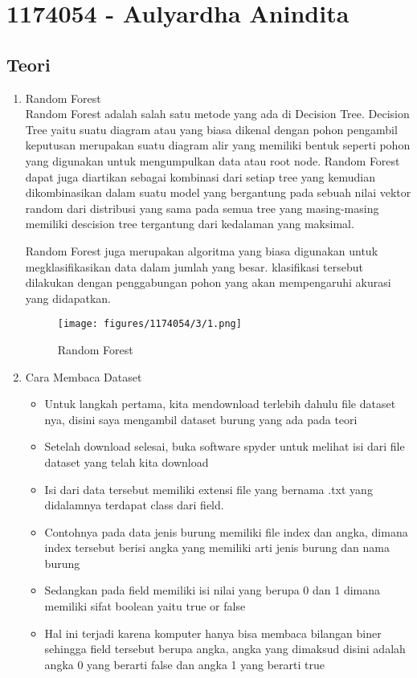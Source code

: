 \section{1174054 - Aulyardha Anindita}

\subsection{Teori}
\begin{enumerate}
\item Random Forest \\
Random Forest adalah salah satu metode yang ada di Decision Tree. Decision Tree yaitu suatu diagram atau yang biasa dikenal dengan pohon pengambil keputusan merupakan suatu diagram alir yang memiliki bentuk seperti pohon yang digunakan untuk mengumpulkan data atau root node. Random Forest dapat juga diartikan sebagai kombinasi dari setiap tree yang kemudian dikombinasikan dalam suatu model yang bergantung pada sebuah nilai vektor random dari distribusi yang sama pada semua tree yang masing-masing memiliki descision tree tergantung dari kedalaman yang maksimal.

Random Forest juga merupakan algoritma yang biasa digunakan untuk megklasifikasikan data dalam jumlah yang besar. klasifikasi tersebut dilakukan dengan penggabungan pohon yang akan mempengaruhi akurasi yang didapatkan.

\begin{figure}[H]
		\texttt{[image: figures/1174054/3/1.png]}
		\centering
		\caption{Random Forest}
\end{figure}

\item Cara Membaca Dataset \\
\begin{itemize}
\item Untuk langkah pertama, kita mendownload terlebih dahulu file dataset nya, disini saya mengambil dataset burung yang ada pada teori
\item Setelah download selesai, buka software spyder untuk melihat isi dari file dataset yang telah kita download
\item Isi dari data tersebut memiliki extensi file yang bernama .txt yang didalamnya terdapat class dari field.
\item Contohnya pada data jenis burung memiliki file index dan angka, dimana index tersebut berisi angka yang memiliki arti jenis burung dan nama burung
\item Sedangkan pada field memiliki isi nilai yang berupa 0 dan 1 dimana memiliki sifat boolean yaitu true or false
\item Hal ini terjadi karena komputer hanya bisa membaca bilangan biner sehingga field tersebut berupa angka, angka yang dimaksud disini adalah angka 0 yang berarti false dan angka 1 yang berarti true
\end{itemize}


\end{enumerate}
